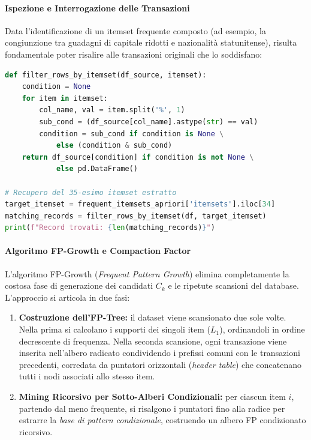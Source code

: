 \paragraph{Ispezione e Interrogazione delle Transazioni}
Data l'identificazione di un itemset frequente composto (ad esempio, la congiunzione tra guadagni di capitale ridotti e nazionalità statunitense), risulta fondamentale poter risalire alle transazioni originali che lo soddisfano:

\begin{lstlisting}[language=Python, caption={Filtraggio delle transazioni che soddisfano uno specifico itemset frequente.}]
def filter_rows_by_itemset(df_source, itemset):
    condition = None
    for item in itemset:
        col_name, val = item.split('%', 1)
        sub_cond = (df_source[col_name].astype(str) == val)
        condition = sub_cond if condition is None \
            else (condition & sub_cond)
    return df_source[condition] if condition is not None \
            else pd.DataFrame()

# Recupero del 35-esimo itemset estratto
target_itemset = frequent_itemsets_apriori['itemsets'].iloc[34]
matching_records = filter_rows_by_itemset(df, target_itemset)
print(f"Record trovati: {len(matching_records)}")
\end{lstlisting}

\paragraph{Algoritmo FP-Growth e Compaction Factor}
L'algoritmo FP-Growth (\textit{Frequent Pattern Growth}) \cite{han2000} elimina completamente la costosa fase di generazione dei candidati $C_k$ e le ripetute scansioni del database. L'approccio si articola in due fasi:
\begin{enumerate}
    \item \textbf{Costruzione dell'FP-Tree:} il dataset viene scansionato due sole volte. Nella prima si calcolano i supporti dei singoli item ($L_1$), ordinandoli in ordine decrescente di frequenza. Nella seconda scansione, ogni transazione viene inserita nell'albero radicato condividendo i prefissi comuni con le transazioni precedenti, corredata da puntatori orizzontali (\textit{header table}) che concatenano tutti i nodi associati allo stesso item.
    \item \textbf{Mining Ricorsivo per Sotto-Alberi Condizionali:} per ciascun item $i$, partendo dal meno frequente, si risalgono i puntatori fino alla radice per estrarre la \textit{base di pattern condizionale}, costruendo un albero FP condizionato ricorsivo.
\end{enumerate}

